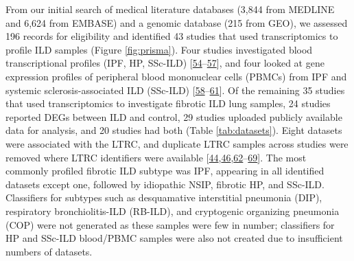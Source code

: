 \documentclass[
]{article}
\begin{document}
From our initial search of medical literature databases (3,844 from MEDLINE and 6,624 from EMBASE) and a genomic database (215 from GEO), we assessed 196 records for eligibility and identified 43 studies that used transcriptomics to profile ILD samples (Figure \ref{fig:prisma}). Four studies investigated blood transcriptional profiles (IPF, HP, SSc-ILD) {[}\protect\hyperlink{ref-yang_peripheral_2012}{54}--\protect\hyperlink{ref-jia_interleukin_2023}{57}{]}, and four looked at gene expression profiles of peripheral blood mononuclear cells (PBMCs) from IPF and systemic sclerosis-associated ILD (SSc-ILD) {[}\protect\hyperlink{ref-huang_sphingosine-1-phosphate_2015}{58}--\protect\hyperlink{ref-assassi_peripheral_2022}{61}{]}. Of the remaining 35 studies that used transcriptomics to investigate fibrotic ILD lung samples, 24 studies reported DEGs between ILD and control, 29 studies uploaded publicly available data for analysis, and 20 studies had both (Table \ref{tab:datasets}). Eight datasets were associated with the LTRC, and duplicate LTRC samples across studies were removed where LTRC identifiers were available {[}\protect\hyperlink{ref-bauer_novel_2015}{44},\protect\hyperlink{ref-schafer_cellular_2017}{46},\protect\hyperlink{ref-cho_systems_2011}{62}--\protect\hyperlink{ref-borie_colocalization_2022}{69}{]}. The most commonly profiled fibrotic ILD subtype was IPF, appearing in all identified datasets except one, followed by idiopathic NSIP, fibrotic HP, and SSc-ILD. Classifiers for subtypes such as desquamative interstitial pneumonia (DIP), respiratory bronchiolitis-ILD (RB-ILD), and cryptogenic organizing pneumonia (COP) were not generated as these samples were few in number; classifiers for HP and SSc-ILD blood/PBMC samples were also not created due to insufficient numbers of datasets.

\captionsetup{width=6.5in}
\end{document}
